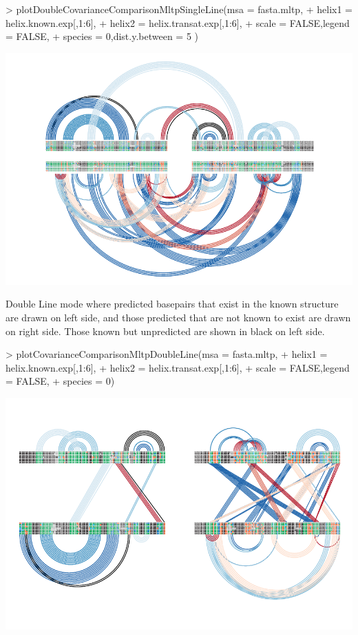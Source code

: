 \documentclass[letterpaper]{article}
\begin{document}
\begin{Schunk}
\begin{Sinput}
> plotDoubleCovarianceComparisonMltpSingleLine(msa = fasta.mltp,
+                                              helix1 = helix.known.exp[,1:6],
+                                              helix2 = helix.transat.exp[,1:6],
+                                              scale = FALSE,legend = FALSE,
+                                              species = 0,dist.y.between = 5 )
\end{Sinput}
\end{Schunk}
\includegraphics{R4RNA-020}

Double Line mode where predicted basepairs that exist in the known structure are drawn
on left side, and those predicted that are not known to exist are drawn on right side.
Those known but unpredicted are shown in black on left side.
\begin{Schunk}
\begin{Sinput}
> plotCovarianceComparisonMltpDoubleLine(msa = fasta.mltp,
+                                        helix1 = helix.known.exp[,1:6],
+                                        helix2 = helix.transat.exp[,1:6],
+                                        scale = FALSE,legend = FALSE,
+                                        species = 0)
\end{Sinput}
\end{Schunk}
\includegraphics{R4RNA-021}
\end{document}
